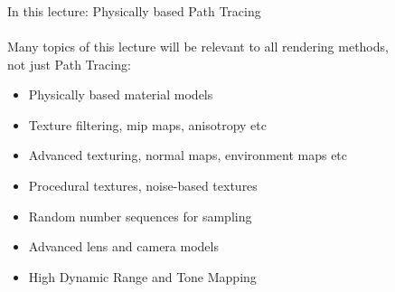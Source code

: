 \documentclass[utf8,stillsansserifmath,fleqn,t]{beamer}
\begin{document}
\begin{frame}
\frametitle{\insertsection}
In this lecture: Physically based Path Tracing\\~\\
Many topics of this lecture will be relevant to all rendering methods,\\ not just Path Tracing:
\begin{itemize}
\item Physically based material models
\item Texture filtering, mip maps, anisotropy etc
\item Advanced texturing, normal maps, environment maps etc
\item Procedural textures, noise-based textures
\item Random number sequences for sampling
\item Advanced lens and camera models
\item High Dynamic Range and Tone Mapping
\end{itemize}
\end{frame}
\end{document}
